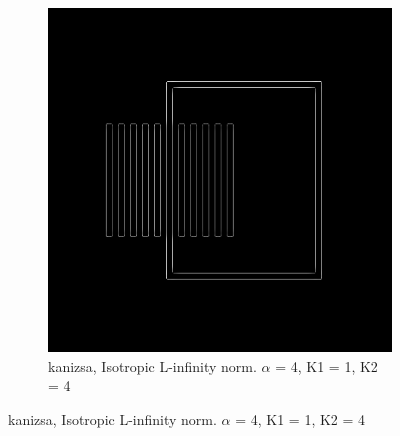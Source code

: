 \begin{figure}[H]
  \centering
  
    \begin{subfigure}{.7\textwidth}
    \centering
    \includegraphics[width=.9\textwidth]{./canny/kanizsa_LINF_a4_k11_k24}
    \caption{kanizsa, Isotropic L-infinity norm. $\alpha$ = 4, K1 = 1, K2 = 4}
    \label{fig:kanizsa_LINF_a4_k11_k24}
  \end{subfigure}%

\end{figure}


